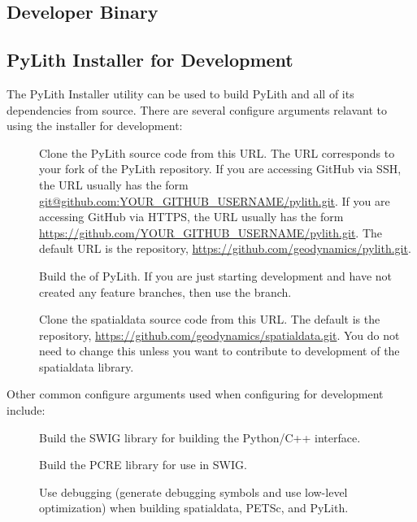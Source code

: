 \subsection{Developer Binary}


\subsection{PyLith Installer for Development}

The PyLith Installer utility can be used to build PyLith and all of
its dependencies from source. There are several configure arguments
relavant to using the installer for development:
\begin{description}
\item[] Clone the PyLith source
  code from this URL. The URL corresponds to your fork of the PyLith
  repository. If you are accessing GitHub via SSH, the URL usually has
  the form \url{git@github.com:YOUR_GITHUB_USERNAME/pylith.git}. If
  you are accessing GitHub via HTTPS, the URL usually has the form
  \url{https://github.com/YOUR_GITHUB_USERNAME/pylith.git}. The
  default URL is the  repository,
  \url{https://github.com/geodynamics/pylith.git}.
\item[] Build the
   of PyLith. If you are just starting development
  and have not created any feature branches, then use the
   branch.
\item[] Clone the
  spatialdata source code from this URL. The default is the
   repository,
  \url{https://github.com/geodynamics/spatialdata.git}. You do not
  need to change this unless you want to contribute to development of
  the spatialdata library.
\end{description}


Other common configure arguments used when configuring for development
include:
\begin{description}
  \item[] Build the SWIG library for
    building the Python/C++ interface.
  \item[] Build the PCRE library for use
    in SWIG.
  \item[] Use debugging (generate
    debugging symbols and use low-level optimization) when building
    spatialdata, PETSc, and PyLith.
\end{description}

